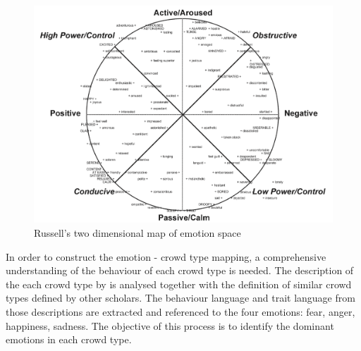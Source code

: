 \begin{figure}[htb!] 
\centering    
\includegraphics[width=1.0\textwidth]{EmotionSpace}
\caption{Russell's two dimensional map of emotion space}
\label{fig:emotionSpace}
\end{figure}

In order to construct the emotion - crowd type mapping, a comprehensive understanding of the behaviour of each crowd type is needed. The description of the each crowd type by \citet{Berlonghi1995} is analysed together with the definition of similar crowd types defined by other scholars. The behaviour language and trait language from those descriptions are extracted and referenced to the four emotions: fear, anger, happiness, sadness. The objective of this process is to identify the dominant emotions in each crowd type. 

